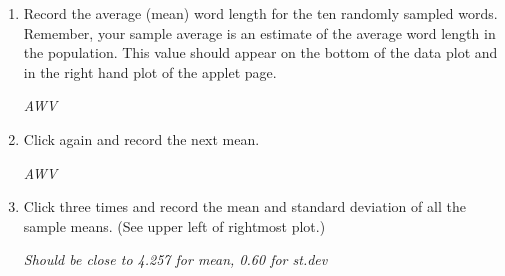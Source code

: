 \begin{enumerate}
\begin{enumerate}
   \item  Click  and erase all the data in the box.
     \item Copy the word length data from D2L.  Select the entire file
       with control-A, copy it to the clipboard with control-C (or use
       the right mouse button to copy) and paste it into the applet's
       data box (use control-V or the mouse option).   Click . You
       should see a plot of all data values with summary
       information.  This is our population of 241 words.
     \item Click ``Show Sampling Options''.  Change Number of Samples to
        and Sample Size to .  Click .   Write 
       out the 10 word lengths in that sample.  
\begin{students}
  \vspace{2cm}
\end{students}    
\begin{key}
   {\it AWV }
\end{key}      
    \end{enumerate}
     \item  Record the average (mean) word length for the ten
       randomly sampled words. Remember, your sample average is an
       estimate of the average word length in the population.  This
       value should appear on the bottom of the data plot and in the
       right hand plot of the applet page.        
\begin{students}
  \vspace{1cm}
\end{students}    
\begin{key}
   {\it AWV}
\end{key}

     \item  Click   again and record the next
       mean.
\begin{students}
  \vspace{1cm}
\end{students}    
\begin{key}
   {\it AWV}
\end{key}
       

     \item \label{3000SRSs} Click   three
         times and record the mean and standard deviation of all the
         sample means. (See upper left of rightmost plot.)       
\begin{students}
  \vspace{1cm}
\end{students}    
\begin{key}
   {\it Should be close to 4.257 for mean, 0.60 for st.dev }
\end{key}
         


\end{enumerate}
